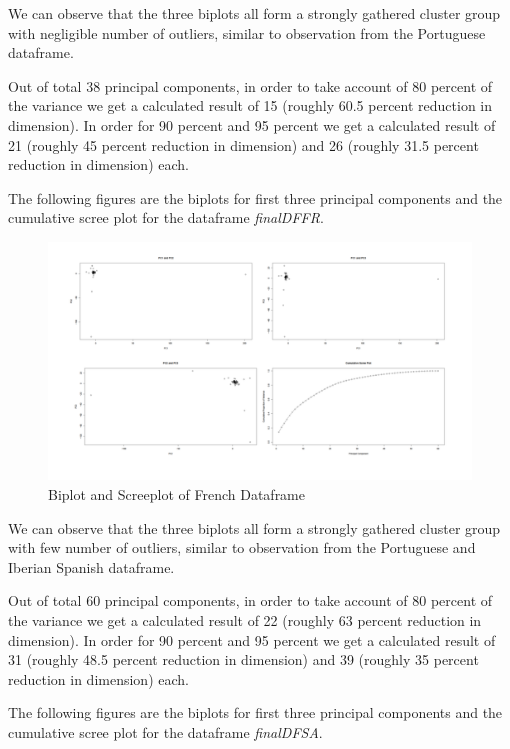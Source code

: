 We can observe that the three biplots all form a strongly gathered cluster group with negligible number of outliers, similar to observation from the Portuguese dataframe.

Out of total 38 principal components, in order to take account of 80 percent of the variance we get a calculated result of 15 (roughly 60.5 percent reduction in dimension). In order for 90 percent and 95 percent we get a calculated result of 21 (roughly 45 percent reduction in dimension) and 26 (roughly 31.5 percent reduction in dimension) each. 

The following figures are the biplots for first three principal components and the cumulative scree plot for the dataframe \emph{finalDFFR}.

\begin{figure}[H]
    \centering
    \includegraphics[width=15cm]{images/PCA/4plotFR.png}
    \caption{Biplot and Screeplot of French Dataframe}
    \label{fig:4plotFR} 
\end{figure}

We can observe that the three biplots all form a strongly gathered cluster group with few number of outliers, similar to observation from the Portuguese and Iberian Spanish dataframe.

Out of total 60 principal components, in order to take account of 80 percent of the variance we get a calculated result of 22 (roughly 63 percent reduction in dimension). In order for 90 percent and 95 percent we get a calculated result of 31 (roughly 48.5 percent reduction in dimension) and 39 (roughly 35 percent reduction in dimension) each. 

The following figures are the biplots for first three principal components and the cumulative scree plot for the dataframe \emph{finalDFSA}.

